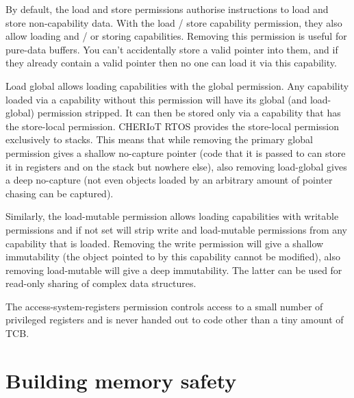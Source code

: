 By default, the load and store permissions authorise instructions to load and store non-capability data.
With the load / store capability permission, they also allow loading and / or storing capabilities.
Removing this permission is useful for pure-data buffers.
You can't accidentally store a valid pointer into them, and if they already contain a valid pointer then no one can load it via this capability. 

Load global allows loading capabilities with the global permission.
Any capability loaded via a capability without this permission will have its global (and load-global) permission stripped.
It can then be stored only via a capability that has the store-local permission.
CHERIoT RTOS provides the store-local permission exclusively to stacks.
This means that while removing the primary global permission gives a shallow no-capture pointer (code that it is passed to can store it in registers and on the stack but nowhere else), also removing load-global gives a deep no-capture (not even objects loaded by an arbitrary amount of pointer chasing can be captured).

Similarly, the load-mutable permission allows loading capabilities with writable permissions and if not set will strip write and load-mutable permissions from any capability that is loaded.
Removing the write permission will give a shallow immutability (the object pointed to by this capability cannot be modified), also removing load-mutable will give a deep immutability.
The latter can be used for read-only sharing of complex data structures.

The access-system-registers permission controls access to a small number of privileged registers and is never handed out to code other than a tiny amount of TCB.

\section{Building memory safety}

